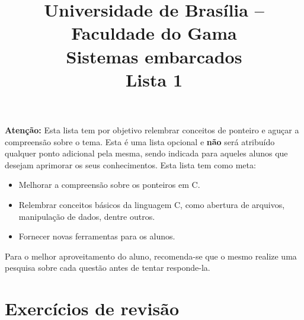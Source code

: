 \documentclass[a4paper,10pt]{article}
\title{ \textbf{Universidade de Brasília -- Faculdade do Gama \\ Sistemas embarcados \\ Lista 1 }}
\date{}
\begin{document}
\maketitle

\paragraph{}
\textbf{Atenção:} Esta lista tem por objetivo relembrar conceitos de ponteiro e aguçar a compreensão sobre o tema. Esta é uma lista opcional e 
\textbf{não} será atribuído qualquer ponto adicional pela mesma, sendo indicada para aqueles alunos que desejam aprimorar os seus conhecimentos.
Esta lista tem como meta:
\begin{itemize}
 \item Melhorar a compreensão sobre os ponteiros em C.
 \item Relembrar conceitos básicos da linguagem C, como abertura de arquivos, manipulação de dados, dentre outros. 
 \item Fornecer novas ferramentas para os alunos.
\end{itemize}
Para o melhor aproveitamento do aluno, recomenda-se que o mesmo realize uma pesquisa sobre cada questão antes de tentar responde-la.

\section{Exercícios de revisão}
\end{document}
